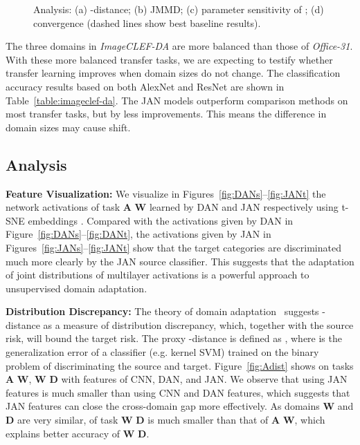 \documentclass{article}
\begin{document}
\begin{figure*}[tbp]
  \centering
  \vspace{-10pt}
  \caption{Analysis: (a) -distance; (b) JMMD; (c) parameter sensitivity of ; (d) convergence (dashed lines show best baseline results).}
  \vspace{-10pt}
\end{figure*}

The three domains in \textit{ImageCLEF-DA} are more balanced than those of \textit{Office-31}. With these more balanced transfer tasks, we are expecting to testify whether transfer learning improves when domain sizes do not change. The classification accuracy results based on both AlexNet and ResNet are shown in Table~\ref{table:imageclef-da}. The JAN models outperform comparison methods on most transfer tasks, but by less improvements. This means the difference in domain sizes may cause shift.

\subsection{Analysis}
\textbf{Feature Visualization:}
We visualize in Figures~\ref{fig:DANs}--\ref{fig:JANt} the network activations of task \textbf{A}  \textbf{W} learned by DAN and JAN respectively using t-SNE embeddings \cite{cite:ICML14DeCAF}. Compared with the activations given by DAN in Figure~\ref{fig:DANs}--\ref{fig:DANt}, the activations given by JAN in Figures~\ref{fig:JANs}--\ref{fig:JANt} show that the target categories are discriminated much more clearly by the JAN source classifier. This suggests that the adaptation of joint distributions of multilayer activations is a powerful approach to unsupervised domain adaptation.

\textbf{Distribution Discrepancy:}
The theory of domain adaptation~\cite{cite:ML10DAT,cite:COLT09DAT} suggests -distance as a measure of distribution discrepancy, which, together with the source risk, will bound the target risk. The proxy -distance is defined as , where  is the generalization error of a classifier (e.g. kernel SVM) trained on the binary problem of discriminating the source and target. Figure~\ref{fig:Adist} shows  on tasks \textbf{A}  \textbf{W}, \textbf{W}  \textbf{D} with features of CNN, DAN, and JAN. We observe that  using JAN features is much smaller than  using CNN and DAN features, which suggests that JAN features can close the cross-domain gap more effectively. As domains \textbf{W} and \textbf{D} are very similar,  of task \textbf{W}  \textbf{D} is much smaller than that of \textbf{A}  \textbf{W}, which explains better accuracy of \textbf{W}  \textbf{D}.
\end{document}
